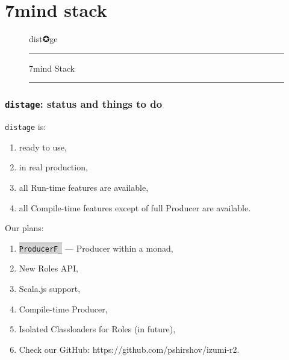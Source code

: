 \documentclass[usenames,dvipsnames]{beamer}
\newcommand{\code}[1]{\colorbox{lightgray}{\texttt{#1}}}
\newcommand{\distage}{\texttt{distage}\xspace}
\begin{document}
\section{7mind stack}
\begin{frame}
  \begin{figure}
  \Huge
  \color{RubineRed} dist✪ge
  \noindent
  \rule{\linewidth}{1mm}
  \Large 7mind Stack
  \rule{\linewidth}{1mm}
  \end{figure}
\end{frame}

\begin{frame}[fragile]
  \frametitle{\distage: status and things to do}
  \distage{} is:
  \begin{enumerate}
    \item ready to use,
    \item in real production,
    \item all Run-time features are available,
    \item all Compile-time features except of full Producer are available.
  \end{enumerate}
  \vspace{0.3cm}
  Our plans:
  \begin{enumerate}
    \item \code{ProducerF\lbrack\_\rbrack} --- Producer within a monad,
    \item New Roles API,
    \item Scala.js support,
    \item Compile-time Producer,
    \item Isolated Classloaders for Roles (in future),
    \item Check our GitHub: https://github.com/pshirshov/izumi-r2.
  \end{enumerate}
\end{frame}
\end{document}

